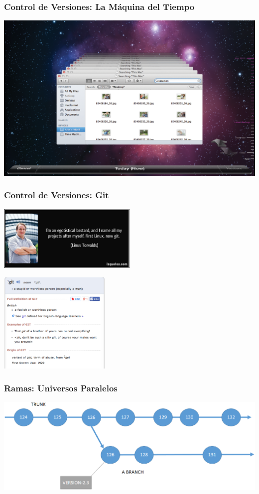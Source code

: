 \documentclass{beamer}
\begin{document}
\begin{frame}
\frametitle{Control de Versiones: La Máquina del Tiempo}
\begin{center}
\includegraphics[width=1.0\textwidth]{img/timemachine.eps}
\end{center}
\end{frame}

\begin{frame}
\frametitle{Control de Versiones: Git}
\begin{center}
\includegraphics[width=0.5\textwidth]{img/quote-linus.eps}

\includegraphics[width=0.4\textwidth]{img/gitdefinition.eps}
\end{center}

\end{frame}

\begin{frame}
\frametitle{Ramas: Universos Paralelos}
\begin{center}
\includegraphics[width=1.0\textwidth]{img/version-control-branch.eps}
\end{center}
\end{frame}
\end{document}
